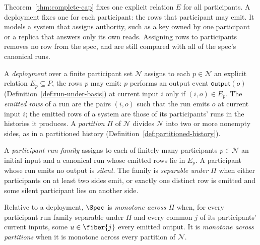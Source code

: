 Theorem~\ref{thm:complete-cap} fixes one explicit relation $E$ for all
participants.  A deployment fixes one for each participant: the rows that
participant may emit.  It models a system that assigns authority, such as a
key owned by one participant or a replica that answers only its own reads.
Assigning rows to participants removes no row from the spec, and
\commitments are still compared with all of the spec's canonical runs.

\begin{definition}
\label{def:deployment}\label{def:emitted-rows}
A \emph{deployment} over a finite participant set $\mathcal N$ assigns to each $p\in\mathcal N$
an explicit relation $E_p\subseteq P$, the rows $p$ may emit: $p$ performs an output event
$\mathsf{output}(o)$ (Definition~\ref{def:run-under-basis}) at current input
$i$ only if $(i,o)\in E_p$.  The \emph{emitted rows} of a run are the
pairs $(i,o)$ such that the run emits $o$ at current input $i$; the emitted
rows of a system are those of its participants' runs in the histories it
produces.  A \emph{partition} $\Pi$ of $\mathcal N$ divides $\mathcal N$ into
two or more nonempty sides, as in a partitioned history
(Definition~\ref{def:partitioned-history}).
\end{definition}

\begin{definition}
\label{def:participant-run-family}
A \emph{participant run family} assigns to each of finitely many participants
$p\in\mathcal N$ an initial input and a canonical run whose emitted rows lie in $E_p$.
A participant whose run emits no output is \emph{silent}.  The family is
\emph{separable under $\Pi$} when either participants on at least two
sides emit, or exactly one distinct row is emitted and some silent
participant lies on another side.
\end{definition}

\begin{definition}
\label{def:monotone-across-partitions}
Relative to a deployment, $\Spec$ is \emph{monotone across $\Pi$} when, for
every participant run family separable under $\Pi$ and every common \indesc $j$
of its participants' current inputs, some $u\in\fiber{j}$ \outrel every
emitted output.  It is \emph{monotone across partitions} when it is monotone
across every partition of $\mathcal N$.
\end{definition}

